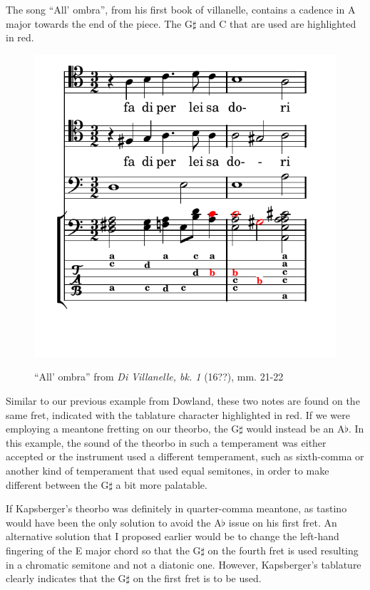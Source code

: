 The song ``All' ombra'', from his first book of villanelle, contains a cadence in A major
towards the end of the piece.  The G$\sharp$ and C that are used  are highlighted in red.
\begin{figure}[h]
\centering
\includegraphics{examples/kaps_ombria.pdf}
\label{kaps-ombria}
\caption{``All' ombra'' from \textit{Di Villanelle, bk. 1} (16??), mm. 21-22 }
\end{figure}
Similar to our previous example from Dowland, these two notes are found on the same
fret, indicated with the tablature character  highlighted in red.  If we were
employing a meantone fretting on our theorbo, the G$\sharp$ would instead be an A$\flat$.
In this example, the sound of the theorbo in such a temperament was either accepted
or the instrument used a different temperament, such as sixth-comma or another kind of
temperament that used equal semitones, in order to make different between the G$\sharp$
a bit more palatable.

If Kapsberger's theorbo was definitely in quarter-comma meantone, as tastino would have
been the only solution to avoid the A$\flat$ issue on his first fret.  An alternative
solution that I proposed earlier would be to change the left-hand fingering of the
E major chord so that the G$\sharp$ on the fourth fret is used resulting in a chromatic
semitone and not a diatonic one.  However, Kapsberger's tablature clearly indicates
that the G$\sharp$ on the first fret is to be used.

